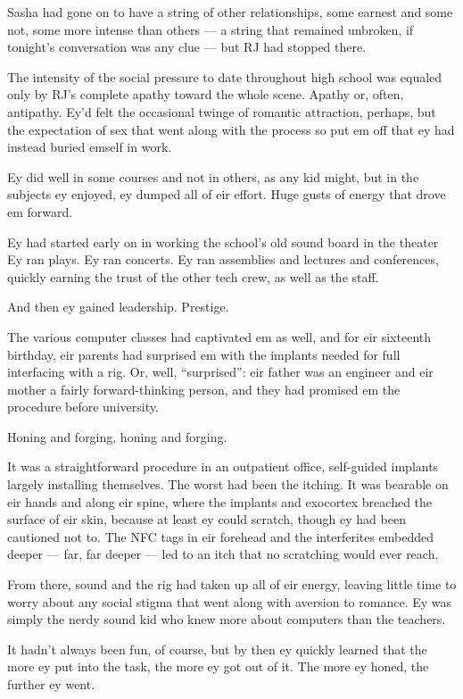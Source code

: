 Sasha had gone on to have a string of other relationships, some earnest and some not, some more intense than others — a string that remained unbroken, if tonight's conversation was any clue — but RJ had stopped there.

The intensity of the social pressure to date throughout high school was equaled only by RJ's complete apathy toward the whole scene. Apathy or, often, antipathy. Ey'd felt the occasional twinge of romantic attraction, perhaps, but the expectation of sex that went along with the process so put em off that ey had instead buried emself in work.

Ey did well in some courses and not in others, as any kid might, but in the subjects ey enjoyed, ey dumped all of eir effort. Huge gusts of energy that drove em forward.

Ey had started early on in working the school's old sound board in the theater Ey ran plays. Ey ran concerts. Ey ran assemblies and lectures and conferences, quickly earning the trust of the other tech crew, as well as the staff.

And then ey gained leadership. Prestige.

The various computer classes had captivated em as well, and for eir sixteenth birthday, eir parents had surprised em with the implants needed for full interfacing with a rig. Or, well, ``surprised'': eir father was an engineer and eir mother a fairly forward-thinking person, and they had promised em the procedure before university.

Honing and forging, honing and forging.

It was a straightforward procedure in an outpatient office, self-guided implants largely installing themselves. The worst had been the itching. It was bearable on eir hands and along eir spine, where the implants and exocortex breached the surface of eir skin, because at least ey could scratch, though ey had been cautioned not to. The NFC tags in eir forehead and the interferites embedded deeper — far, far deeper — led to an itch that no scratching would ever reach.

From there, sound and the rig had taken up all of eir energy, leaving little time to worry about any social stigma that went along with aversion to romance. Ey was simply the nerdy sound kid who knew more about computers than the teachers.

It hadn't always been fun, of course, but by then ey quickly learned that the more ey put into the task, the more ey got out of it. The more ey honed, the further ey went.

